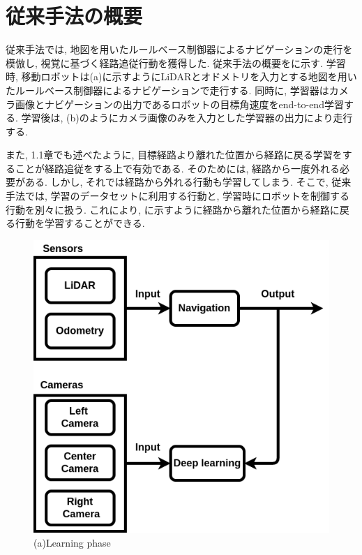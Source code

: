 
\section{従来手法の概要}
従来手法\cite{okada-si2020}では, 地図を用いたルールベース制御器によるナビゲーションの走行を模倣し, 視覚に基づく経路追従行動を獲得した. 従来手法の概要をに示す. 学習時, 移動ロボットは(a)に示すようにLiDARとオドメトリを入力とする地図を用いたルールベース制御器によるナビゲーションで走行する. 同時に, 学習器はカメラ画像とナビゲーションの出力であるロボットの目標角速度をend-to-end学習する. 学習後は, (b)のようにカメラ画像のみを入力とした学習器の出力により走行する. \par また, 1.1章でも述べたように, 目標経路より離れた位置から経路に戻る学習をすることが経路追従をする上で有効である. そのためには, 経路から一度外れる必要がある. しかし, それでは経路から外れる行動も学習してしまう. そこで, 従来手法では, 学習のデータセットに利用する行動と, 学習時にロボットを制御する行動を別々に扱う. これにより, に示すように経路から離れた位置から経路に戻る行動を学習することができる. 

\newpage
\begin{figure}[h]
  \centering
  \includegraphics[keepaspectratio, scale=0.36]{images/old-method1.png}
  \caption*{(a)Learning phase}
  \end{figure}

